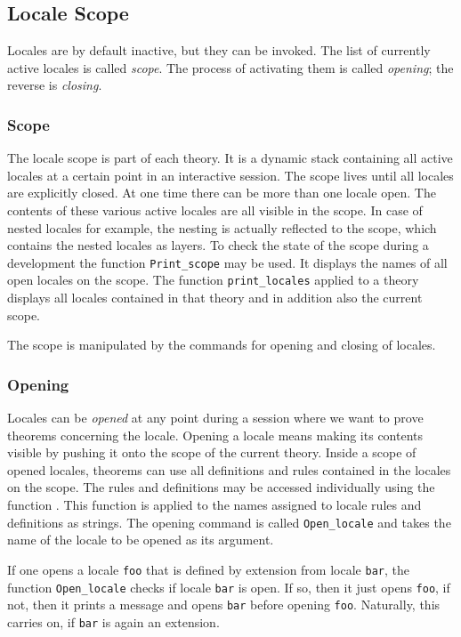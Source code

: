 \subsection{Locale Scope}

Locales are by default inactive, but they can be invoked.  The list of
currently active locales is called \emph{scope}.  The process of activating
them is called \emph{opening}; the reverse is \emph{closing}.

\subsubsection{Scope}
The locale scope is part of each theory.  It is a dynamic stack containing
all active locales at a certain point in an interactive session.
The scope lives until all locales are explicitly closed.  At one time there
can be more than one locale open.  The contents of these various active
locales are all visible in the scope.  In case of nested locales for example,
the nesting is actually reflected to the scope, which contains the nested
locales as layers.  To check the state of the scope during a development the
function \texttt{Print\_scope} may be used.  It displays the names of all open
locales on the scope.  The function \texttt{print\_locales} applied to a theory
displays all locales contained in that theory and in addition also the
current scope.

The scope is manipulated by the commands for opening and closing of locales. 

\subsubsection{Opening}
Locales can be \emph{opened} at any point during a session where
we want to prove theorems concerning the locale.  Opening a locale means
making its contents visible by pushing it onto the scope of the current
theory.  Inside a scope of opened locales, theorems can use all definitions and
rules contained in the locales on the scope.  The rules and definitions may
be accessed individually using the function .  This function is
applied to the names assigned to locale rules and definitions as
strings.  The opening command is called \texttt{Open\_locale} and takes the 
name of the locale to be opened as its argument.

If one opens a locale \texttt{foo} that is defined by extension from locale
\texttt{bar}, the function \texttt{Open\_locale} checks if locale \texttt{bar}
is open.  If so, then it just opens \texttt{foo}, if not, then it prints a
message and opens \texttt{bar} before opening \texttt{foo}.  Naturally, this
carries on, if \texttt{bar} is again an extension.

